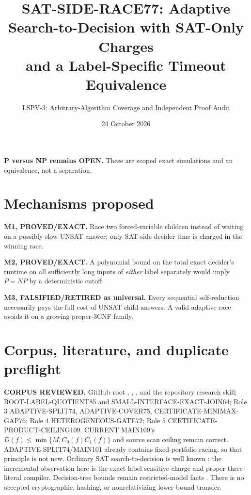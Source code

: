 \documentclass[11pt]{article}
\title{SAT-SIDE-RACE77: Adaptive Search-to-Decision with SAT-Only Charges\\ and a Label-Specific Timeout Equivalence}
\author{LSPV-3: Arbitrary-Algorithm Coverage and Independent Proof Audit}
\date{24 October 2026}
\begin{document}
\maketitle
\begin{center}\textbf{P versus NP remains OPEN.} These are scoped exact simulations and an equivalence, not a separation.\end{center}
\section{Mechanisms proposed}
\noindent\textbf{M1, PROVED/EXACT.} Race two forced-variable children instead of waiting on a possibly slow UNSAT answer; only SAT-side decider time is charged in the winning race. 
\par\noindent\textbf{M2, PROVED/EXACT.} A polynomial bound on the total exact decider's runtime on all sufficiently long inputs of \emph{either} label separately would imply $P=NP$ by a deterministic cutoff.
\par\noindent\textbf{M3, FALSIFIED/RETIRED as universal.} Every sequential self-reduction necessarily pays the full cost of UNSAT child answers. A valid adaptive race avoids it on a growing proper-3CNF family.
\section{Corpus, literature, and duplicate preflight}
\noindent\textbf{CORPUS REVIEWED.} GitHub root , , , and the repository research skill; ROOT-LABEL-QUOTIENT85 and SMALL-INTERFACE-EXACT-JOIN64; Role 3 ADAPTIVE-SPLIT74, ADAPTIVE-COVER75, CERTIFICATE-MINIMAX-GAP76; Role 4 HETEROGENEOUS-GATE72; Role 5 CERTIFICATE-PRODUCT-CEILING109. CURRENT MAIN109's $D(f)\le \min\{M,C_0(f)C_1(f)\}$ and source scan ceiling remain correct. ADAPTIVE-SPLIT74/MAIN101 already contains fixed-portfolio racing, so that principle is not new. Ordinary SAT search-to-decision is well known \cite{gk}; the incremental observation here is the exact label-sensitive charge and proper-three-literal compiler. Decision-tree bounds remain restricted-model facts \cite{bdw}. There is no accepted cryptographic, hashing, or nonrelativizing lower-bound transfer.
\end{document}
